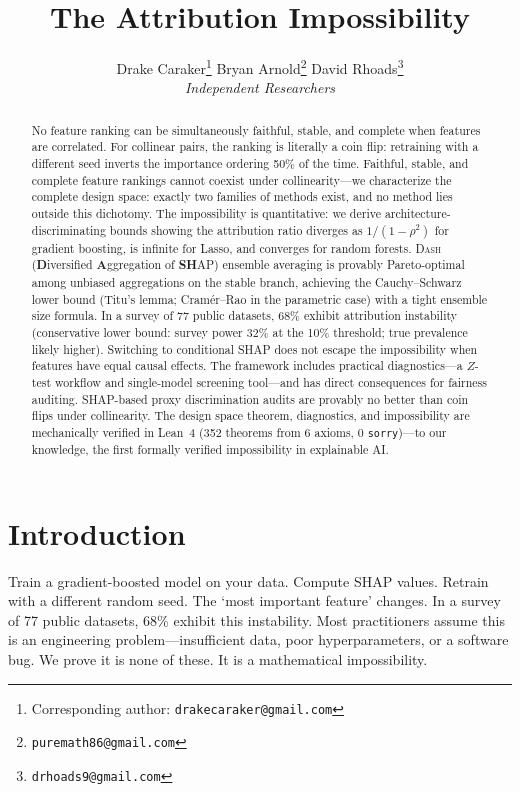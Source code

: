 \documentclass{article}
\title{The Attribution Impossibility}
\author{
  Drake Caraker\thanks{Corresponding author: \texttt{drakecaraker@gmail.com}} \quad
  Bryan Arnold\thanks{\texttt{puremath86@gmail.com}} \quad
  David Rhoads\thanks{\texttt{drhoads9@gmail.com}} \\[4pt]
  \textit{Independent Researchers}
}
\newcommand{\DASH}{\textsc{Dash}}
\begin{document}
\maketitle

\begin{abstract}
No feature ranking can be simultaneously faithful, stable, and complete when features are correlated. For collinear pairs, the ranking is literally a coin flip: retraining with a different seed inverts the importance ordering 50\% of the time.
Faithful, stable, and complete feature rankings cannot coexist under collinearity---we characterize the complete design space: exactly two families of methods exist, and no method lies outside this dichotomy.
The impossibility is quantitative: we derive architecture-discriminating bounds showing the attribution ratio diverges as $1/(1{-}\rho^2)$ for gradient boosting, is infinite for Lasso, and converges for random forests.
\DASH{} (\textbf{D}iversified \textbf{A}ggregation of \textbf{SH}AP) ensemble averaging is provably Pareto-optimal among unbiased aggregations on the stable branch, achieving the Cauchy--Schwarz lower bound (Titu's lemma; Cram\'er--Rao in the parametric case) with a tight ensemble size formula.
In a survey of 77 public datasets, 68\% exhibit attribution instability (conservative lower bound: survey power 32\% at the 10\% threshold; true prevalence likely higher).
Switching to conditional SHAP does not escape the impossibility when features have equal causal effects.
The framework includes practical diagnostics---a $Z$-test workflow and single-model screening tool---and has direct consequences for fairness auditing.
SHAP-based proxy discrimination audits are provably no better than coin flips under collinearity.
The design space theorem, diagnostics, and impossibility are mechanically verified in Lean~4 (352 theorems from 6 axioms, 0 \texttt{sorry})---to our knowledge, the first formally verified impossibility in explainable AI.
\end{abstract}

\section{Introduction}
\label{sec:intro}

Train a gradient-boosted model on your data. Compute SHAP values. Retrain with a different random seed. The `most important feature' changes. In a survey of 77 public datasets, 68\% exhibit this instability. Most practitioners assume this is an engineering problem---insufficient data, poor hyperparameters, or a software bug. We prove it is none of these. It is a mathematical impossibility.
\end{document}
